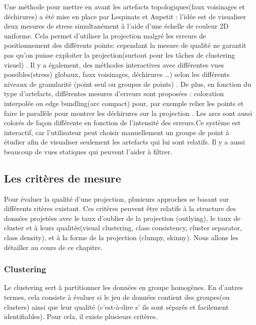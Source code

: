 Une méthode pour mettre en avant les artefacts topologiques(faux voisinages et déchirures) a été mise en place par Lespinats et Aupetit \cite{CheckViz} : l’idée est de visualiser deux mesures de stress simultanément à l’aide d’une échelle de couleur 2D uniforme. 
Cela permet d’utiliser la projection malgré les erreurs de positionnement des différents points: cependant la mesure de qualité ne garantit pas qu’on puisse exploiter la projection(surtout pour les tâches de clustering visuel) .
\newline
Il y a également, des méthodes interactives avec différentes vues
possibles(stress) globaux, faux voisinages, déchirures …) selon les différents niveaux de
granularité (point seul ou groupes de points) \cite{abbas2019clustme} \cite{HeulotThese}. De plus, en fonction du type d’artefacts,
différentes mesures d’erreurs sont proposées : coloration interpolée ou edge bundling(arc
compact) pour, par exemple relier les points et faire le parallèle pour montrer les déchirures
sur la projection \cite{holten2006-EDGE1} \cite{holten2011-EDGE2} \cite{HeulotThese}. Les arcs sont aussi colorés de façon différente en fonction de l’intensité
des erreurs.\newline Ce système est interactif, car l’utilisateur peut choisir manuellement un groupe de point à
étudier afin de visualiser seulement les artefacts qui lui sont relatifs. Il y a aussi beaucoup de
vues statiques qui peuvent l’aider à filtrer.

\subsection{Les critères de mesure}

Pour évaluer la qualité d’une projection, plusieurs approches se basant sur différents ritères existant.
Ces critères peuvent être relatifs à la structure des données projetées avec le taux d’oublier de la projection (outlying), le taux de cluster et à leurs qualités(visual clustering, class consistency, cluster separator, class density), et à la forme de la projection (clumpy, skinny).
Nous allons les détailler au cours de ce chapitre.

\subsubsection{Clustering}
Le clustering sert à partitionner les données en groupe homogènes. En d’autres termes, cela consiste à évaluer si le jeu de données contient des groupes(ou clusters) ainsi que leur qualité (c'est-à-dire s’ ils sont séparés et facilement identifiables).
Pour cela, il existe plusieurs critères.

